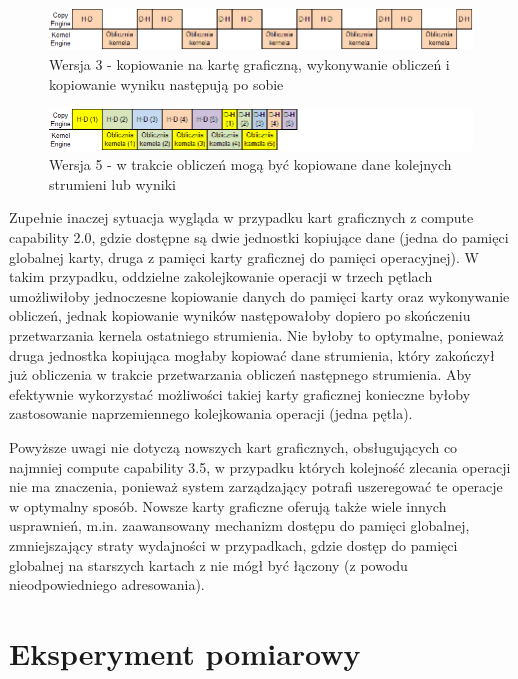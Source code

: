 \documentclass[12pt,a4paper]{article}
\begin{document}
\begin{figure}[H]
  \centering
  \includegraphics[width=\linewidth]{images/sync.png}
  \caption{Wersja 3 - kopiowanie na kartę graficzną, wykonywanie obliczeń i kopiowanie wyniku następują po sobie}
  \label{fig:seq}
\end{figure}

\begin{figure}[H]
  \centering
  \includegraphics[width=\linewidth]{images/async.png}
  \caption{Wersja 5 - w trakcie obliczeń mogą być kopiowane dane kolejnych strumieni lub wyniki}
  \label{fig:async}
\end{figure}

Zupełnie inaczej sytuacja wygląda w przypadku kart graficznych z compute capability 2.0, gdzie dostępne są dwie jednostki kopiujące dane (jedna do pamięci globalnej karty, druga z pamięci karty graficznej do pamięci operacyjnej). W takim przypadku, oddzielne zakolejkowanie operacji w trzech pętlach umożliwiłoby jednoczesne kopiowanie danych do pamięci karty oraz wykonywanie obliczeń, jednak kopiowanie wyników następowałoby dopiero po skończeniu przetwarzania kernela ostatniego strumienia. Nie byłoby to optymalne, ponieważ druga jednostka kopiująca mogłaby kopiować dane strumienia, który zakończył już obliczenia w trakcie przetwarzania obliczeń następnego strumienia. Aby efektywnie wykorzystać możliwości takiej karty graficznej konieczne byłoby zastosowanie naprzemiennego kolejkowania operacji (jedna pętla).

Powyższe uwagi nie dotyczą nowszych kart graficznych, obsługujących co najmniej compute capability 3.5, w przypadku których kolejność zlecania operacji nie ma znaczenia, ponieważ system zarządzający potrafi uszeregować te operacje w optymalny sposób. Nowsze karty graficzne oferują także wiele innych usprawnień, m.in. zaawansowany mechanizm dostępu do pamięci globalnej, zmniejszający straty wydajności w przypadkach, gdzie dostęp do pamięci globalnej na starszych kartach z nie mógł być łączony (z powodu nieodpowiedniego adresowania).


\section{Eksperyment pomiarowy}
\end{document}
